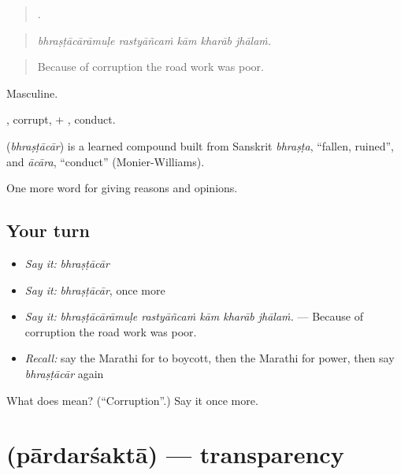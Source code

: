 \begin{quote}
    .
\end{quote}

\begin{quote}
\emph{bhraṣṭācārāmuḷe rastyāñcaṁ kām kharāb jhālaṁ.}
\end{quote}

\begin{quote}
Because of corruption the road work was poor.
\end{quote}

Masculine.

, corrupt, + , conduct.

\begin{cousinweb}
\textbf{} (\emph{bhraṣṭācār}) is a learned compound built from Sanskrit \emph{bhraṣṭa}, \textquotedblleft{}fallen, ruined\textquotedblright{}, and \emph{ācāra}, \textquotedblleft{}conduct\textquotedblright{} (Monier-Williams).
\end{cousinweb}

\begin{grammarlens}[title={What you've built}]
One more word for giving reasons and opinions.
\end{grammarlens}

\subsection*{Your turn}
\begin{itemize}
\raggedright
  \item \emph{Say it:} \emph{bhraṣṭācār}
  \item \emph{Say it:} \emph{bhraṣṭācār}, once more
  \item \emph{Say it:} \emph{bhraṣṭācārāmuḷe rastyāñcaṁ kām kharāb jhālaṁ.} — Because of corruption the road work was poor.
  \item \emph{Recall:} say the Marathi for to boycott, then the Marathi for power, then say \emph{bhraṣṭācār} again
\end{itemize}

\begin{tcolorbox}[breakable,colback=teal!4,colframe=teal!35!black,title={Before you move on}]
What does  mean? (\textquotedblleft{}Corruption\textquotedblright{}.) Say it once more.
\end{tcolorbox}
\section[\texorpdfstring{\mr{पारदर्शकता} (pārdarśaktā)}{पारदर्शकता (pārdarśaktā)}]{ (pārdarśaktā) — transparency}

